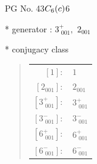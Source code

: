 \documentclass[fleqn,8pt]{jsarticle}
\begin{document}
\setcounter{MaxMatrixCols}{32}

\renewcommand{\tablename}{Table~}
\renewcommand{\figurename}{Figure~}
\begin{center}
\LARGE
PG No. 43\quad$C_{\rm 6}(c)$\quad$6$\quad[ hexagonal ]
\end{center}

* generator : $3^{+}_{\,\,001},\,\,2{}_{001}$

* conjugacy class
\begin{quote}
\begin{tabular}{rl}
$ [1]: $ & $ 1 $ \\
$ [2{}_{001}]: $ & $ 2{}_{001} $ \\
$ [3^{+}_{\,\,001}]: $ & $ 3^{+}_{\,\,001} $ \\
$ [3^{-}_{\,\,001}]: $ & $ 3^{-}_{\,\,001} $ \\
$ [6^{+}_{\,\,001}]: $ & $ 6^{+}_{\,\,001} $ \\
$ [6^{-}_{\,\,001}]: $ & $ 6^{-}_{\,\,001} $
\end{tabular}
\end{quote}
\end{document}
